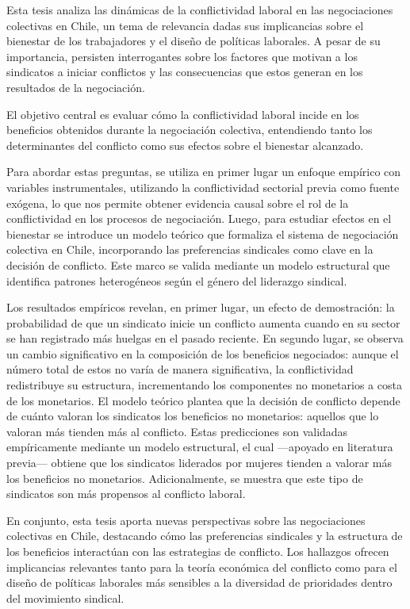 \documentclass[english]{umemoria}
\begin{document}
\begin{resumen}
Esta tesis analiza las dinámicas de la conflictividad laboral en las negociaciones colectivas en Chile, un tema de relevancia dadas sus implicancias sobre el bienestar de los trabajadores y el diseño de políticas laborales. A pesar de su importancia, persisten interrogantes sobre los factores que motivan a los sindicatos a iniciar conflictos y las consecuencias que estos generan en los resultados de la negociación.

El objetivo central es evaluar cómo la conflictividad laboral incide en los beneficios obtenidos durante la negociación colectiva, entendiendo tanto los determinantes del conflicto como sus efectos sobre el bienestar alcanzado.

Para abordar estas preguntas, se utiliza en primer lugar un enfoque empírico con variables instrumentales, utilizando la conflictividad sectorial previa como fuente exógena, lo que nos permite obtener evidencia causal sobre el rol de la conflictividad en los procesos de negociación. Luego, para estudiar efectos en el bienestar se introduce un modelo teórico que formaliza el sistema de negociación colectiva en Chile, incorporando las preferencias sindicales como clave en la decisión de conflicto. Este marco se valida mediante un modelo estructural que identifica patrones heterogéneos según el género del liderazgo sindical.

Los resultados empíricos revelan, en primer lugar, un efecto de demostración: la probabilidad de que un sindicato inicie un conflicto aumenta cuando en su sector se han registrado más huelgas en el pasado reciente. En segundo lugar, se observa un cambio significativo en la composición de los beneficios negociados: aunque el número total de estos no varía de manera significativa, la conflictividad redistribuye su estructura, incrementando los componentes no monetarios a costa de los monetarios. El modelo teórico plantea que la decisión de conflicto depende de cuánto valoran los sindicatos los beneficios no monetarios: aquellos que lo valoran más tienden más al conflicto. Estas predicciones son validadas empíricamente mediante un modelo estructural, el cual —apoyado en literatura previa— obtiene que los sindicatos liderados por mujeres tienden a valorar más los beneficios no monetarios. Adicionalmente, se muestra que este tipo de sindicatos son más propensos al conflicto laboral.

En conjunto, esta tesis aporta nuevas perspectivas sobre las negociaciones colectivas en Chile, destacando cómo las preferencias sindicales y la estructura de los beneficios interactúan con las estrategias de conflicto. Los hallazgos ofrecen implicancias relevantes tanto para la teoría económica del conflicto como para el diseño de políticas laborales más sensibles a la diversidad de prioridades dentro del movimiento sindical.\end{resumen}
\end{document}
